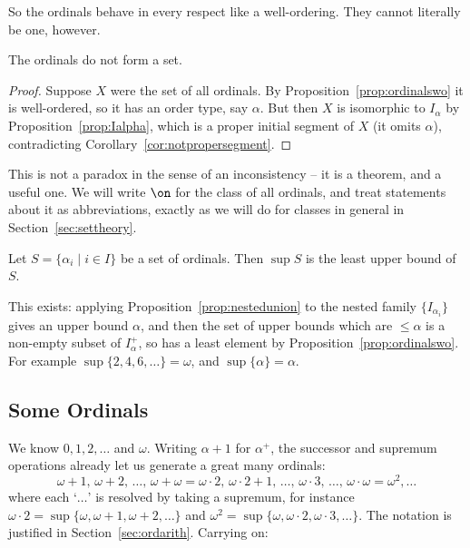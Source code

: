 So the ordinals behave in every respect like a well-ordering. They cannot literally be one, however.

\begin{theorem}
  The ordinals do not form a set.
\end{theorem}
\begin{proof}
  Suppose $X$ were the set of all ordinals. By Proposition~\ref{prop:ordinalswo} it is well-ordered, so it has an order type, say $\alpha$. But then $X$ is isomorphic to $I_\alpha$ by Proposition~\ref{prop:Ialpha}, which is a proper initial segment of $X$ (it omits $\alpha$), contradicting Corollary~\ref{cor:notpropersegment}.
\end{proof}

This is not a paradox in the sense of an inconsistency -- it is a theorem, and a useful one. We will write $\on$ for the class of all ordinals, and treat statements about it as abbreviations, exactly as we will do for classes in general in Section~\ref{sec:settheory}.

\begin{definition}[Supremum]
  Let $S = \{\alpha_i \mid i \in I\}$ be a set of ordinals. Then $\sup S$ is the least upper bound of $S$.
\end{definition}

This exists: applying Proposition~\ref{prop:nestedunion} to the nested family $\{I_{\alpha_i}\}$ gives an upper bound $\alpha$, and then the set of upper bounds which are $\leq \alpha$ is a non-empty subset of $I_{\alpha}^+$, so has a least element by Proposition~\ref{prop:ordinalswo}. For example $\sup\{2, 4, 6, \dots\} = \omega$, and $\sup\{\alpha\} = \alpha$.

\subsection{Some Ordinals}

We know $0, 1, 2, \dots$ and $\omega$. Writing $\alpha + 1$ for $\alpha^+$, the successor and supremum operations already let us generate a great many ordinals:
$$\omega + 1, \, \omega+2, \, \dots, \, \omega + \omega = \omega \cdot 2, \, \omega\cdot 2 + 1, \, \dots, \, \omega \cdot 3, \, \dots, \, \omega \cdot \omega = \omega^2, \dots$$
where each `$\dots$' is resolved by taking a supremum, for instance $\omega \cdot 2 = \sup\{\omega, \omega + 1, \omega + 2, \dots\}$ and $\omega^2 = \sup\{\omega, \omega\cdot 2, \omega \cdot 3, \dots\}$. The notation is justified in Section~\ref{sec:ordarith}. Carrying on:

